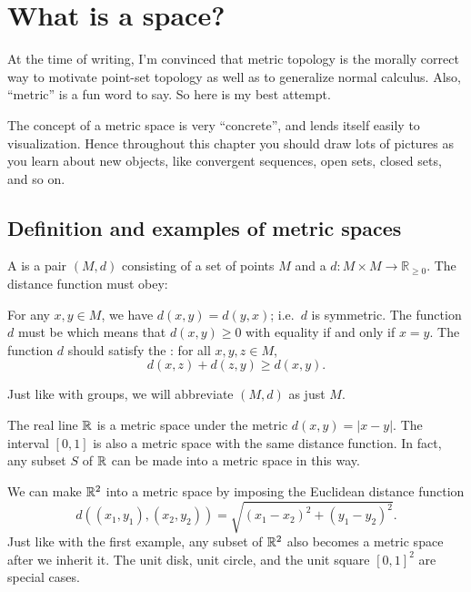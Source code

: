 \chapter{What is a space?}
At the time of writing, I'm convinced that metric topology is
the morally correct way to motivate point-set topology
as well as to generalize normal calculus.
Also, ``metric'' is a fun word to say.
So here is my best attempt.

The concept of a metric space is very ``concrete'', and lends itself easily to visualization. Hence throughout this chapter you should draw lots of pictures as you learn about new objects, like convergent sequences, open sets, closed sets, and so on.

\section{Definition and examples of metric spaces}
\begin{definition}
	A  is a pair $(M, d)$ consisting of
	a set of points $M$
	and a  $d : M \times M \to \mathbb R_{\ge 0}$.
	The distance function must obey:
	\begin{itemize}
		\ii For any $x,y \in M$, we have $d(x,y) = d(y,x)$; i.e.\ $d$ is symmetric.
		\ii The function $d$ must be 
		which means that $d(x,y) \ge 0$ with equality if and only if $x=y$.
		\ii The function $d$ should satisfy the : for all $x,y,z \in M$,
		\[ d(x,z) + d(z,y) \ge d(x,y). \]
	\end{itemize}
\end{definition}
\begin{abuse}
	Just like with groups, we will abbreviate $(M,d)$ as just $M$.
\end{abuse}
\begin{example}
	\listhack
	\begin{enumerate}[(a)]
		\ii The real line $\mathbb R$ is a metric space under the metric $d(x,y) = \left\lvert x-y \right\rvert$.
		\ii The interval $[0,1]$ is also a metric space with the same distance function.
		\ii In fact, any subset $S$ of $\mathbb R$ can be made into a metric space in this way.
	\end{enumerate}
\end{example}
\begin{example}
	\listhack
	\begin{enumerate}[(a)]
		\ii We can make $\mathbb R^2$ into a metric space by imposing the Euclidean distance function
		\[ d\left( (x_1, y_1), (x_2, y_2) \right) = \sqrt{(x_1-x_2)^2 + (y_1-y_2)^2}. \]
		\ii Just like with the first example, any subset of $\mathbb R^2$ also becomes a metric space after we inherit it.
		The unit disk, unit circle, and the unit square $[0,1]^2$
		are special cases.
	\end{enumerate}
\end{example}
